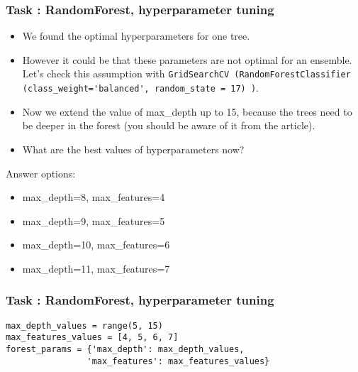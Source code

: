 \begin{frame}[fragile]\frametitle{Task : RandomForest, hyperparameter tuning}
\begin{itemize}
\item We found the optimal hyperparameters for one tree. 
\item However it could be that these parameters are not optimal for an ensemble. Let's check this assumption with \lstinline|GridSearchCV (RandomForestClassifier (class_weight='balanced', random_state = 17) )|. 
\item Now we extend the value of max\_depth up to 15, because the trees need to be deeper in the forest (you should be aware of it from the article). 
\item What are the best values of hyperparameters now?
\end{itemize}

Answer options:

\begin{itemize}
\item max\_depth=8, max\_features=4
\item max\_depth=9, max\_features=5
\item max\_depth=10, max\_features=6
\item max\_depth=11, max\_features=7

\end{itemize}
\end{frame}

\begin{frame}[fragile]\frametitle{Task : RandomForest, hyperparameter tuning}
\begin{lstlisting}
max_depth_values = range(5, 15)
max_features_values = [4, 5, 6, 7]
forest_params = {'max_depth': max_depth_values,
                'max_features': max_features_values}
\end{lstlisting}
\end{frame}

